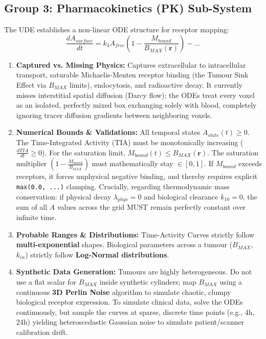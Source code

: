 \documentclass[11pt,a4paper]{article}
\begin{document}
\subsection{Group 3: Pharmacokinetics (PK) Sub-System}

The UDE establishes a non-linear ODE structure for receptor mapping:
\begin{equation}
    \frac{dA_{surface}}{dt} = k_3 A_{free}\left(1 - \frac{M_{bound}}{B_{MAX}(\mathbf{r})}\right) - \dots
\end{equation}

\begin{enumerate}
    \item \textbf{Captured vs. Missing Physics:} Captures extracellular to intracellular transport, saturable Michaelis-Menten receptor binding (the Tumour Sink Effect via $B_{MAX}$ limits), endocytosis, and radioactive decay. It currently misses interstitial spatial diffusion (Darcy flow); the ODEs treat every voxel as an isolated, perfectly mixed box exchanging solely with blood, completely ignoring tracer diffusion gradients between neighboring voxels.
    \item \textbf{Numerical Bounds \& Validations:} All temporal states $A_{state}(t) \ge 0$. The Time-Integrated Activity (TIA) must be monotonically increasing ($\frac{dTIA}{dt} \ge 0$). For the saturation limit, $M_{bound}(t) \le B_{MAX}(\mathbf{r})$. The saturation multiplier $\left(1 - \frac{M_{bound}}{B_{MAX}}\right)$ must mathematically stay $\in [0, 1]$. If $M_{bound}$ exceeds receptors, it forces unphysical negative binding, and thereby requires explicit \texttt{max(0.0, ...)} clamping. Crucially, regarding thermodynamic mass conservation: if physical decay $\lambda_{phys} = 0$ and biological clearance $k_{10} = 0$, the sum of all $A$ values across the grid MUST remain perfectly constant over infinite time.
    \item \textbf{Probable Ranges \& Distributions:} Time-Activity Curves strictly follow \textbf{multi-exponential} shapes. Biological parameters across a tumour ($B_{MAX}$, $k_{in}$) strictly follow \textbf{Log-Normal distributions}.
    \item \textbf{Synthetic Data Generation:} Tumours are highly heterogeneous. Do not use a flat scalar for $B_{MAX}$ inside synthetic cylinders; map $B_{MAX}$ using a continuous \textbf{3D Perlin Noise} algorithm to simulate chaotic, clumpy biological receptor expression. To simulate clinical data, solve the ODEs continuously, but sample the curves at sparse, discrete time points (e.g., 4h, 24h) yielding heteroscedastic Gaussian noise to simulate patient/scanner calibration drift.
\end{enumerate}
\end{document}
